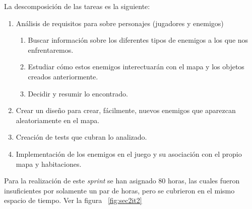 La descomposición de las tareas es la siguiente:

\begin{enumerate}[label=\bfseries WBS 2.\arabic*]
  \item Análisis de requisitos para sobre personajes (jugadores y enemigos)
    \begin{enumerate}[label=\bfseries WBS 2.1.\arabic*]
      \item Buscar información sobre los diferentes tipos de enemigos a los que nos enfrentaremos.
      \item Estudiar cómo estos enemigos interectuarán con el mapa y los objetos creados anteriormente.
      \item Decidir y resumir lo encontrado.
    \end{enumerate}
  \item Crear un diseño para crear, fácilmente, nuevos enemigos que aparezcan aleatoriamente en el mapa.
  \item Creación de tests que cubran lo analizado.
  \item Implementación de los enemigos en el juego y su asociación con el propio mapa y habitaciones.
\end{enumerate}

Para la realización de este \textit{sprint} se han asignado 80 horas, las cuales fueron insuficientes por solamente un par de horas, pero se cubrieron en el mismo espacio de tiempo. Ver la figura ~\ref{fig:sec2it2}